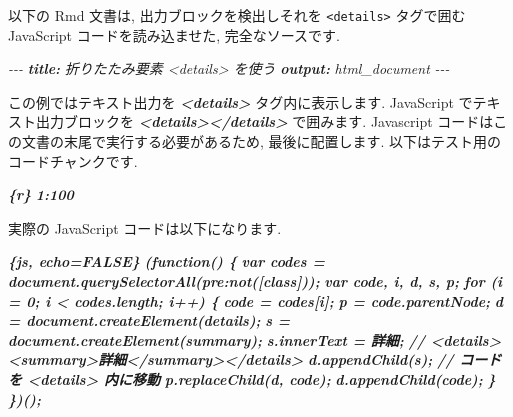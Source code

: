 \documentclass[
  11pt,
  lualatex,
  ja=standard]{bxjsreport}
\newenvironment{Shaded}{\begin{snugshade}}{\end{snugshade}}
\newcommand{\AnnotationTok}[1]{\textcolor[rgb]{0.56,0.35,0.01}{\textbf{\textit{#1}}}}
\newcommand{\CommentTok}[1]{\textcolor[rgb]{0.56,0.35,0.01}{\textit{#1}}}
\newcommand{\InformationTok}[1]{\textcolor[rgb]{0.56,0.35,0.01}{\textbf{\textit{#1}}}}
\newcommand{\NormalTok}[1]{#1}
\begin{document}
以下の Rmd 文書は, 出力ブロックを検出しそれを \texttt{\textless{}details\textgreater{}} タグで囲む JavaScript コードを読み込ませた, 完全なソースです.

\begin{Shaded}
\begin{Highlighting}[]
\CommentTok{{-}{-}{-}}
\AnnotationTok{title:}\CommentTok{ 折りたたみ要素 \textasciigrave{}\textless{}details\textgreater{}\textasciigrave{} を使う}
\AnnotationTok{output:}\CommentTok{ html\_document}
\CommentTok{{-}{-}{-}}

\NormalTok{この例ではテキスト出力を }\InformationTok{\textasciigrave{}\textless{}details\textgreater{}\textasciigrave{}}\NormalTok{ タグ内に表示します.}
\NormalTok{JavaScript でテキスト出力ブロックを }\InformationTok{\textasciigrave{}\textless{}details\textgreater{}\textless{}/details\textgreater{}\textasciigrave{}}\NormalTok{ で囲みます.}
\NormalTok{Javascript コードはこの文書の末尾で実行する必要があるため,}
\NormalTok{最後に配置します. 以下はテスト用のコードチャンクです.}

\InformationTok{\textasciigrave{}\textasciigrave{}\textasciigrave{}\{r\}}
\InformationTok{1:100}
\InformationTok{\textasciigrave{}\textasciigrave{}\textasciigrave{}}

\NormalTok{実際の JavaScript コードは以下になります.}

\InformationTok{\textasciigrave{}\textasciigrave{}\textasciigrave{}\{js, echo=FALSE\}}
\InformationTok{(function() \{}
\InformationTok{  var codes = document.querySelectorAll(\textquotesingle{}pre:not([class])\textquotesingle{});}
\InformationTok{  var code, i, d, s, p;}
\InformationTok{  for (i = 0; i \textless{} codes.length; i++) \{}
\InformationTok{    code = codes[i];}
\InformationTok{    p = code.parentNode;}
\InformationTok{    d = document.createElement(\textquotesingle{}details\textquotesingle{});}
\InformationTok{    s = document.createElement(\textquotesingle{}summary\textquotesingle{});}
\InformationTok{    s.innerText = \textquotesingle{}詳細\textquotesingle{};}
\InformationTok{    // \textless{}details\textgreater{}\textless{}summary\textgreater{}詳細\textless{}/summary\textgreater{}\textless{}/details\textgreater{}}
\InformationTok{    d.appendChild(s);}
\InformationTok{    // コードを \textless{}details\textgreater{} 内に移動}
\InformationTok{    p.replaceChild(d, code);}
\InformationTok{    d.appendChild(code);}
\InformationTok{  \}}
\InformationTok{\})();}
\InformationTok{\textasciigrave{}\textasciigrave{}\textasciigrave{}}
\end{Highlighting}
\end{Shaded}
\end{document}
